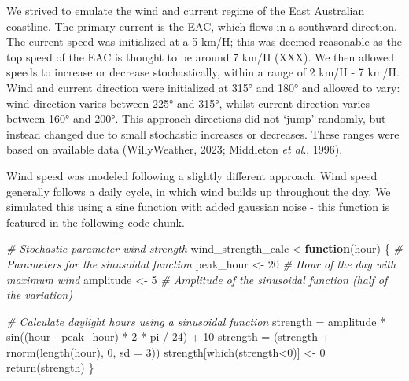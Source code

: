 \documentclass[
]{article}
\newenvironment{Shaded}{\begin{snugshade}}{\end{snugshade}}
\newcommand{\AttributeTok}[1]{\textcolor[rgb]{0.77,0.63,0.00}{#1}}
\newcommand{\CommentTok}[1]{\textcolor[rgb]{0.56,0.35,0.01}{\textit{#1}}}
\newcommand{\ControlFlowTok}[1]{\textcolor[rgb]{0.13,0.29,0.53}{\textbf{#1}}}
\newcommand{\DecValTok}[1]{\textcolor[rgb]{0.00,0.00,0.81}{#1}}
\newcommand{\FunctionTok}[1]{\textcolor[rgb]{0.00,0.00,0.00}{#1}}
\newcommand{\NormalTok}[1]{#1}
\newcommand{\OtherTok}[1]{\textcolor[rgb]{0.56,0.35,0.01}{#1}}
\newcommand{\SpecialCharTok}[1]{\textcolor[rgb]{0.00,0.00,0.00}{#1}}
\begin{document}
We strived to emulate the wind and current regime of the East Australian
coastline. The primary current is the EAC, which flows in a southward
direction. The current speed was initialized at a 5 km/H; this was
deemed reasonable as the top speed of the EAC is thought to be around 7
km/H (XXX). We then allowed speeds to increase or decrease
stochastically, within a range of 2 km/H - 7 km/H. Wind and current
direction were initialized at 315° and 180° and allowed to vary: wind
direction varies between 225° and 315°, whilst current direction varies
between 160° and 200°. This approach directions did not `jump' randomly,
but instead changed due to small stochastic increases or decreases.
These ranges were based on available data (WillyWeather, 2023; Middleton
\emph{et al}., 1996).

Wind speed was modeled following a slightly different approach. Wind
speed generally follows a daily cycle, in which wind builds up
throughout the day. We simulated this using a sine function with added
gaussian noise - this function is featured in the following code chunk.

\begin{Shaded}
\begin{Highlighting}[]
\CommentTok{\# Stochastic parameter wind strength}
\NormalTok{wind\_strength\_calc }\OtherTok{\textless{}{-}}\ControlFlowTok{function}\NormalTok{(hour) \{}
  \CommentTok{\# Parameters for the sinusoidal function}
\NormalTok{  peak\_hour }\OtherTok{\textless{}{-}} \DecValTok{20}        \CommentTok{\# Hour of the day with maximum wind}
\NormalTok{  amplitude }\OtherTok{\textless{}{-}} \DecValTok{5}       \CommentTok{\# Amplitude of the sinusoidal function (half of the variation)}
  
  
  \CommentTok{\# Calculate daylight hours using a sinusoidal function}
\NormalTok{  strength }\OtherTok{=}\NormalTok{ amplitude }\SpecialCharTok{*} \FunctionTok{sin}\NormalTok{((hour }\SpecialCharTok{{-}}\NormalTok{ peak\_hour) }\SpecialCharTok{*} \DecValTok{2} \SpecialCharTok{*}\NormalTok{ pi }\SpecialCharTok{/} \DecValTok{24}\NormalTok{) }\SpecialCharTok{+} \DecValTok{10} 
\NormalTok{  strength }\OtherTok{=}\NormalTok{ (strength }\SpecialCharTok{+} \FunctionTok{rnorm}\NormalTok{(}\FunctionTok{length}\NormalTok{(hour), }\DecValTok{0}\NormalTok{, }\AttributeTok{sd =} \DecValTok{3}\NormalTok{))}
\NormalTok{  strength[}\FunctionTok{which}\NormalTok{(strength}\SpecialCharTok{\textless{}}\DecValTok{0}\NormalTok{)] }\OtherTok{\textless{}{-}} \DecValTok{0}
  \FunctionTok{return}\NormalTok{(strength)}
\NormalTok{\}}
\end{Highlighting}
\end{Shaded}
\end{document}
